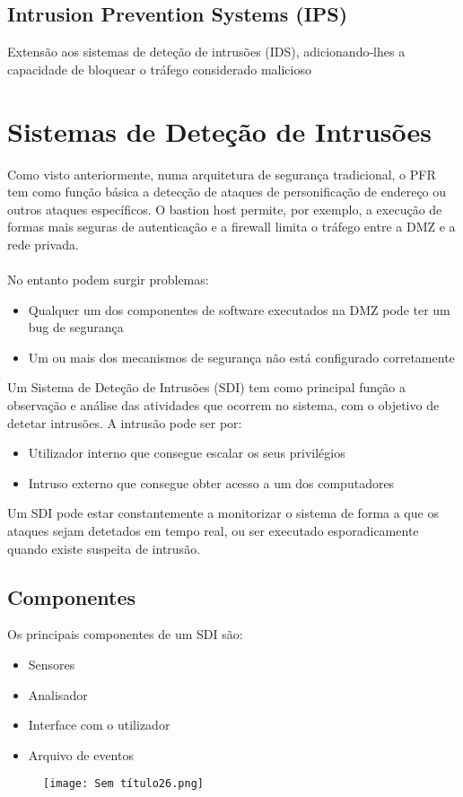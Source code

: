 \documentclass[10pt,a4paper]{report}
\begin{document}
\subsection{Intrusion Prevention Systems (IPS)}
Extensão aos sistemas de deteção de intrusões (IDS), adicionando-lhes a capacidade de bloquear o tráfego considerado malicioso
\section{Sistemas de Deteção de Intrusões}
Como visto anteriormente, numa arquitetura de segurança tradicional, o PFR tem como função básica a detecção de ataques de personificação de endereço ou outros ataques específicos. O bastion host permite, por exemplo, a execução de formas mais seguras de autenticação e a firewall limita o tráfego entre a DMZ e a rede privada.\\
\\
No entanto podem surgir problemas:
\begin{itemize}
\item Qualquer um dos componentes de software executados na DMZ pode ter um bug de segurança
\item Um ou mais dos mecanismos de segurança não está configurado corretamente
\end{itemize}
Um Sistema de Deteção de Intrusões (SDI) tem como principal função a observação e análise das atividades que ocorrem no sistema, com o objetivo de detetar intrusões. A intrusão pode ser por:
\begin{itemize}
\item Utilizador interno que consegue escalar os seus privilégios
\item Intruso externo que consegue obter acesso a um dos computadores
\end{itemize}
Um SDI pode estar constantemente a monitorizar o sistema de forma a que os ataques sejam detetados em tempo real, ou ser executado esporadicamente
quando existe suspeita de intrusão.
\subsection{Componentes}
Os principais componentes de um SDI são:
\begin{itemize}
\item Sensores
\item Analisador
\item Interface com o utilizador
\item Arquivo de eventos
\end{itemize}
\begin{figure}[H]
\centering
\texttt{[image: Sem título26.png]}
\end{figure}
\end{document}
